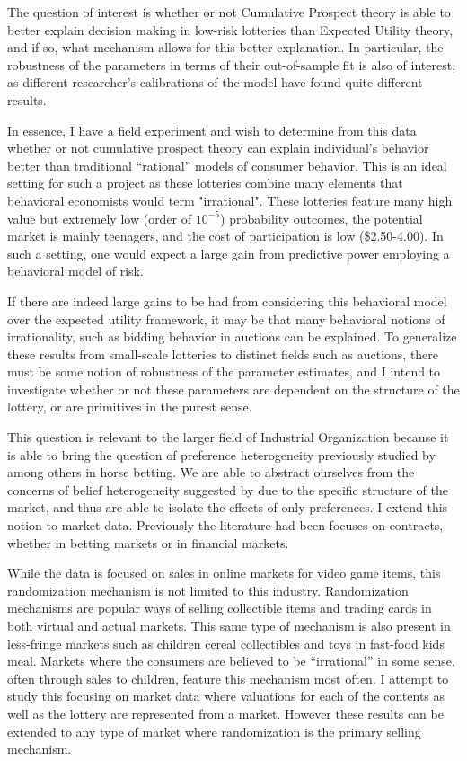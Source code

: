 \documentclass[12pt]{paper}
\begin{document}
The question of interest is whether or not Cumulative Prospect theory
is able to better explain decision making in low-risk lotteries than
Expected Utility theory, and if so, what mechanism allows for this
better explanation. In particular, the robustness of the parameters in
terms of their out-of-sample fit is also of interest, as different
researcher's calibrations of the model have found quite different
results. 

In essence, I have a field experiment and wish to determine from this
data whether or not cumulative prospect theory can explain
individual's behavior better than traditional ``rational'' models of
consumer behavior. This is an ideal setting for such a project as
these lotteries combine many elements that behavioral economists would
term "irrational". These lotteries feature many high value but
extremely low (order of $10^{-5}$) probability outcomes, the potential
market is mainly teenagers, and the cost of participation is low
(\$2.50-4.00). In such a setting, one would expect a large gain from
predictive power employing a behavioral model of risk.

If there are indeed large gains to be had from considering this
behavioral model over the expected utility framework, it may be that
many behavioral notions of irrationality, such as bidding behavior in
auctions can be explained. To generalize these results from
small-scale lotteries to distinct fields such as auctions, there must
be some notion of robustness of the parameter estimates, and I intend
to investigate whether or not these parameters are dependent on the
structure of the lottery, or are primitives in the purest sense. 

This question is relevant to the larger field of Industrial
Organization because it is able to bring the question of preference
heterogeneity previously studied by \cite{Snowberg2010} among others
in horse betting. We are able to abstract ourselves from the concerns
of belief heterogeneity suggested by \cite{Gandhi2014} due to the
specific structure of the market, and thus are able to isolate the
effects of only preferences. I extend this notion to market
data. Previously the literature had been focuses on contracts, whether
in betting markets or in financial markets.

While the data is focused on sales in online markets for video game
items, this randomization mechanism is not limited to this industry.
Randomization mechanisms are popular ways of selling collectible items
and trading cards in both virtual and actual markets. This same type
of mechanism is also present in less-fringe markets such as children
cereal collectibles and toys in fast-food kids meal. Markets where the
consumers are believed to be ``irrational'' in some sense, often
through sales to children, feature this mechanism most often. I
attempt to study this focusing on market data where valuations for
each of the contents as well as the lottery are represented from a
market. However these results can be extended to any type of market
where randomization is the primary selling mechanism.
\end{document}

